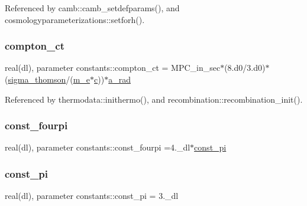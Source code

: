 Referenced by camb\+::camb\+\_\+setdefparams(), and cosmologyparameterizations\+::setforh().

\mbox{\label{namespaceconstants_a3052f16975d19bbadee1a287f219830a}} 
\subsubsection{\texorpdfstring{compton\+\_\+ct}{compton\_ct}}
{\footnotesize\ttfamily real(dl), parameter constants\+::compton\+\_\+ct = M\+P\+C\+\_\+in\+\_\+sec$\ast$(8.d0/3.d0)$\ast$(\mbox{\hyperlink{namespaceconstants_aaf2f1c6fdfe22c4836ab4d2a47e53373}{sigma\+\_\+thomson}}/(\mbox{\hyperlink{namespaceconstants_a9337199d9a72664967dbaf4132e99266}{m\+\_\+e}}$\ast$\mbox{\hyperlink{namespaceconstants_acf9c352e48b37fa8a9aff3e5957246b8}{c}}))$\ast$\mbox{\hyperlink{namespaceconstants_a8930b886e85c5c95942db45cb3485fbe}{a\+\_\+rad}}}



Referenced by thermodata\+::inithermo(), and recombination\+::recombination\+\_\+init().

\mbox{\label{namespaceconstants_a4bd1ae51e175028d0c5bc4d28c2143e6}} 
\subsubsection{\texorpdfstring{const\+\_\+fourpi}{const\_fourpi}}
{\footnotesize\ttfamily real(dl), parameter constants\+::const\+\_\+fourpi =4.\+\_\+dl$\ast$\mbox{\hyperlink{namespaceconstants_ae6b5af15d3fb28a3dba468486c548447}{const\+\_\+pi}}}

\mbox{\label{namespaceconstants_ae6b5af15d3fb28a3dba468486c548447}} 
\subsubsection{\texorpdfstring{const\+\_\+pi}{const\_pi}}
{\footnotesize\ttfamily real(dl), parameter constants\+::const\+\_\+pi = 3.\+\_\+dl}



